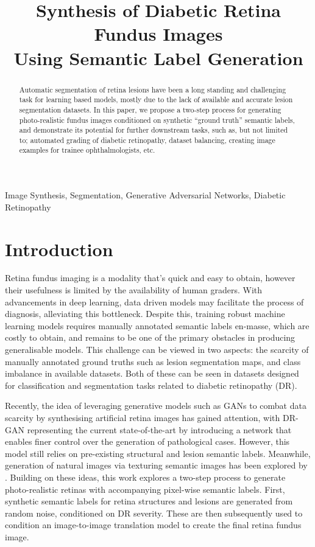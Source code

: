 \documentclass{midl} %
\title[Synthesis of Diabetic Retina Fundus Images Using Semantic Label Generation]{Synthesis of Diabetic Retina Fundus Images \\ Using Semantic Label Generation}
\begin{document}
\maketitle

\begin{abstract}
Automatic segmentation of retina lesions have been a long standing and challenging task for learning based models, mostly due to the lack of available and accurate lesion segmentation datasets. In this paper, we propose a two-step process for generating photo-realistic fundus images conditioned on synthetic ``ground truth'' semantic labels, and demonstrate its potential for further downstream tasks, such as, but not limited to; automated grading of diabetic retinopathy, dataset balancing, creating image examples for trainee ophthalmologists, etc.
\end{abstract}

\begin{keywords}
Image Synthesis, Segmentation, Generative Adversarial Networks, Diabetic Retinopathy
\end{keywords}

\section{Introduction}

Retina fundus imaging is a modality that's quick and easy to obtain, however their usefulness is limited by the availability of human graders.
With advancements in deep learning, data driven models may facilitate the process of diagnosis, alleviating this bottleneck.
Despite this, training robust machine learning models requires manually annotated semantic labels en-masse, which are costly to obtain, and remains to be one of the primary obstacles in producing generalisable models.
This challenge can be viewed in two aspects: the scarcity of manually annotated ground truths such as lesion segmentation maps, and class imbalance in available datasets.
Both of these can be seen in datasets designed for classification and segmentation tasks related to diabetic retinopathy (DR). 

Recently, the idea of leveraging generative models such as GANs to combat data scarcity by synthesising artificial retina images has gained attention, with DR-GAN \cite{Zhou_2020} representing the current state-of-the-art by introducing a network that enables finer control over the generation of pathological cases.
However, this model still relies on pre-existing structural and lesion semantic labels. 
Meanwhile, generation of natural images via texturing semantic images has been explored by \citealt{Volokitin_2020_CVPR_Workshops}.
Building on these ideas, this work explores a two-step process to generate photo-realistic retinas with accompanying pixel-wise semantic labels.
First, synthetic semantic labels for retina structures and lesions are generated from random noise, conditioned on DR severity.
These are then subsequently used to condition an image-to-image translation model to create the final retina fundus image. 
\end{document}
